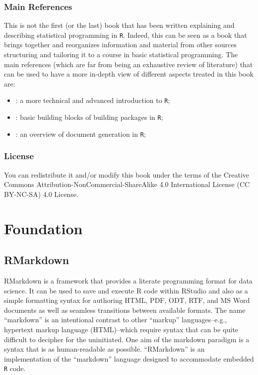 \documentclass[12pt,]{krantz}
\providecommand{\tightlist}{%
  \setlength{\itemsep}{0pt}\setlength{\parskip}{0pt}}
\begin{document}
\section{Main References}\label{main-references}

This is not the first (or the last) book that has been written
explaining and describing statistical programming in \texttt{R}. Indeed,
this can be seen as a book that brings together and reorganizes
information and material from other sources structuring and tailoring it
to a course in basic statistical programming. The main references (which
are far from being an exhaustive review of literature) that can be used
to have a more in-depth view of different aspects treated in this book
are:

\begin{itemize}
\tightlist
\item
  \citet{wickham2014advanced} : a more technical and advanced
  introduction to \texttt{R};
\item
  \citet{wickham2015packages} : basic building blocks of building
  packages in \texttt{R};
\item
  \citet{xie2015} : an overview of document generation in \texttt{R};
\end{itemize}

\section{License}\label{license}

You can redistribute it and/or modify this book under the terms of the
Creative Commons Attribution-NonCommercial-ShareAlike 4.0 International
License (CC BY-NC-SA) 4.0 License.

\part{Foundation}\label{part-foundation}

\chapter{RMarkdown}\label{rmarkdown}

RMarkdown is a framework that provides a literate programming format for
data science. It can be used to save and execute R code within RStudio
and also as a simple formatting syntax for authoring HTML, PDF, ODT,
RTF, and MS Word documents as well as seamless transitions between
available formats. The name ``markdown'' is an intentional contrast to
other ``markup'' languages--e.g., hypertext markup language
(HTML)--which require syntax that can be quite difficult to decipher for
the uninitiated. One aim of the markdown paradigm is a syntax that is as
human-readable as possible. ``RMarkdown'' is an implementation of the
``markdown'' language designed to accommodate embedded \texttt{R} code.
\end{document}
